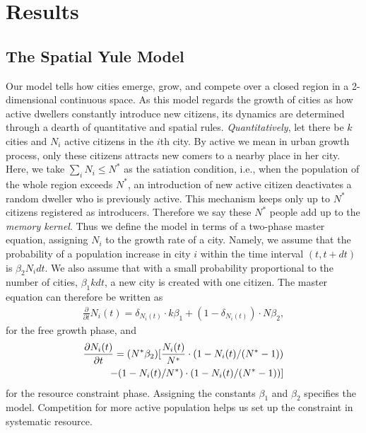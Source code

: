 \documentclass[reprint,unsortedaddress,amsmath,amssymb,aps,prl,showkeys]{revtex4-2}
\begin{document}
\section{Results}

\subsection{The Spatial Yule Model}
Our model tells how cities emerge, grow, and compete over a closed region in a 2-dimensional continuous space. As this model regards the growth of cities as how active dwellers constantly introduce new citizens, its dynamics are determined through a dearth of quantitative and spatial rules. \emph{Quantitatively}, let there be $k$ cities and $N_i$ active citizens in the $i$th city. By active we mean in urban growth process, only these citizens attracts new comers to a nearby place in her city. Here, we take $\sum_{i} N_i \le N^*$ as the satiation condition, i.e., when the population of the whole region exceeds $N^*$, an introduction of new active citizen deactivates a random dweller who is previously active. This mechanism keeps only up to $N^*$ citizens registered as introducers. Therefore we say these $N^*$ people add up to the \emph{memory kernel}. Thus we define the model in terms of a two-phase master equation, assigning $N_i$ to the growth rate of a city. Namely, we assume that the probability of a population increase in city $i$ within the time interval $(t,t+dt)$ is $\beta_2N_idt$. We also assume that with a small probability proportional to the number of cities, $\beta_1kdt$, a new city is created with one citizen. The master equation can therefore be written as \begin{align}\frac{\partial}{\partial t}N_i(t) =  \delta_{N_i(t)}\cdot k\beta_1+ (1-\delta_{N_i(t)})\cdot N\beta_2, \end{align} for the free growth phase, and \begin{align}
	\frac{\partial N_i(t)}{\partial t}  = (N^*\beta_2)[\frac{N_i(t)}{N^*}\cdot(1-N_i(t)/(N^*-1))& \notag\\  - (1-N_i(t)/N^*)\cdot (1-N_i(t)/(N^*-1)) ]&
\end{align}
for the resource constraint phase. Assigning the constants $\beta_1$ and $\beta_2$ specifies the model. Competition for more active population helps us set up the constraint in systematic resource. 
\end{document}
